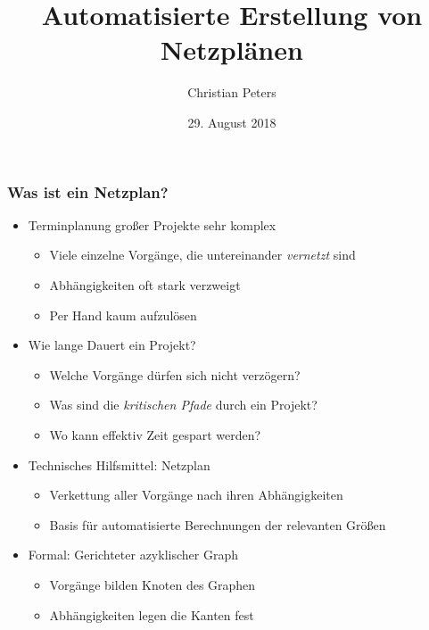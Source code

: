 \documentclass[ngerman, t]{beamer}
\title{Automatisierte Erstellung von Netzpl\"anen}
\author{Christian Peters}
\institute{Institut f\"ur Kernphysik}
\date{29. August 2018}
\begin{document}
\maketitle

\begin{frame}
  \frametitle{Was ist ein Netzplan?}
  \begin{itemize}
    \item Terminplanung gro{\ss}er Projekte sehr komplex
      \begin{itemize}
        \item Viele einzelne Vorg\"ange, die untereinander
          \textit{vernetzt} sind
        \item Abh\"angigkeiten oft stark verzweigt
        \item Per Hand kaum aufzul\"osen
      \end{itemize}
    \item Wie lange Dauert ein Projekt?
      \begin{itemize}
        \item Welche Vorg\"ange d\"urfen sich nicht verz\"ogern?
        \item Was sind die \textit{kritischen Pfade} durch ein
          Projekt?
        \item Wo kann effektiv Zeit gespart werden?
      \end{itemize}
    \item Technisches Hilfsmittel: Netzplan
      \begin{itemize}
        \item Verkettung aller Vorg\"ange nach ihren Abh\"angigkeiten
        \item Basis f\"ur automatisierte Berechnungen der relevanten
          Gr\"o{\ss}en
      \end{itemize}
    \item Formal: Gerichteter azyklischer Graph
      \begin{itemize}
        \item Vorg\"ange bilden Knoten des Graphen
        \item Abh\"angigkeiten legen die Kanten fest
      \end{itemize}
  \end{itemize}
\end{frame}
\end{document}
